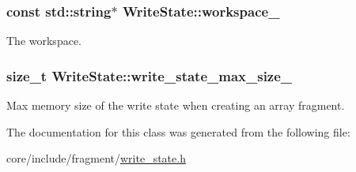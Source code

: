 \subsubsection[{workspace\+\_\+}]{\setlength{\rightskip}{0pt plus 5cm}const std\+::string$\ast$ Write\+State\+::workspace\+\_\+\hspace{0.3cm}{\ttfamily [private]}}\label{classWriteState_ac794be3613148e959cc2dd138a06553d}
The workspace. \hypertarget{classWriteState_ae709f5fb288797a81ef52b29c954732e}{}
\subsubsection[{write\+\_\+state\+\_\+max\+\_\+size\+\_\+}]{\setlength{\rightskip}{0pt plus 5cm}size\+\_\+t Write\+State\+::write\+\_\+state\+\_\+max\+\_\+size\+\_\+\hspace{0.3cm}{\ttfamily [private]}}\label{classWriteState_ae709f5fb288797a81ef52b29c954732e}
Max memory size of the write state when creating an array fragment. 

The documentation for this class was generated from the following file\+:\begin{DoxyCompactItemize}
\item 
core/include/fragment/\hyperlink{write__state_8h}{write\+\_\+state.\+h}\end{DoxyCompactItemize}
